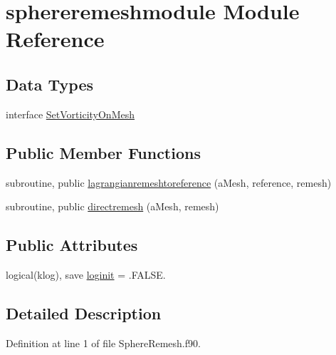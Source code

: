 \hypertarget{classsphereremeshmodule}{\section{sphereremeshmodule Module Reference}
\label{classsphereremeshmodule}
}
\subsection*{Data Types}
\begin{DoxyCompactItemize}
\item 
interface \hyperlink{interfacesphereremeshmodule_1_1SetVorticityOnMesh}{Set\+Vorticity\+On\+Mesh}
\end{DoxyCompactItemize}
\subsection*{Public Member Functions}
\begin{DoxyCompactItemize}
\item 
subroutine, public \hyperlink{classsphereremeshmodule_a973c1790eb740fe5b11551b74608d04f}{lagrangianremeshtoreference} (a\+Mesh, reference, remesh)
\item 
subroutine, public \hyperlink{classsphereremeshmodule_a1611368242ae6f618fde2bf44cd4f79b}{directremesh} (a\+Mesh, remesh)
\end{DoxyCompactItemize}
\subsection*{Public Attributes}
\begin{DoxyCompactItemize}
\item 
logical(klog), save \hyperlink{classsphereremeshmodule_abb7d03fe481567ce717c9eab0fd37dc1}{loginit} = .F\+A\+L\+S\+E.
\end{DoxyCompactItemize}


\subsection{Detailed Description}


Definition at line 1 of file Sphere\+Remesh.\+f90.



